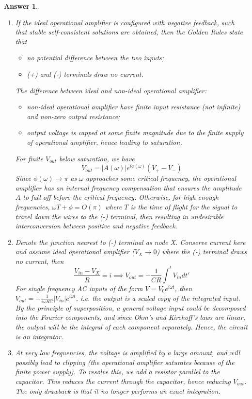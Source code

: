 \documentclass[a4paper]{article}
\newtheorem{ans}{Answer}[subsection]
\theoremstyle{new}
\begin{document}
\begin{ans}\leavevmode
\begin{enumerate}[label=(\roman*)]
\item If the ideal operational amplifier is configured with negative feedback, such that stable self-consistent solutions are obtained, then the Golden Rules state that
\begin{itemize}
    \item no potential difference between the two inputs;
    \item (+) and (-) terminals draw no current.
\end{itemize}
The difference between ideal and non-ideal operational amplifier:
\begin{itemize}
    \item non-ideal operational amplifier have finite input resistance (not infinite) and non-zero output resistance;
    \item output voltage is capped at some finite magnitude due to the finite supply of operational amplifier, hence leading to saturation.
\end{itemize}
For finite $V_{out}$ below saturation, we have
$$V_{out}=|A(\omega)|e^{i\phi(\omega)}(V_+-V_-)$$
Since $\phi(\omega)\rightarrow\pi$ as $\omega$ approaches some critical frequency, the operational amplifier has an internal frequency compensation that ensures the amplitude $A$ to fall off before the critical frequency. Otherwise, for high enough frequencies, $\omega T+\phi=O(\pi)$ where $T$ is the time of flight for the signal to travel down the wires to the (-) terminal, then resulting in undesirable interconversion between positive and negative feedback.
\item Denote the junction nearest to (-) terminal as node X. Conserve current here and assume ideal operational amplifier ($V_X\rightarrow 0$) where the (-) terminal draws no current, then
$$\frac{V_{in}-V_X}{R}=i\implies V_{out}=-\frac{1}{CR}\int^tV_{in}dt'$$
For single frequency AC inputs of the form $V=V_0e^{i\omega t}$, then $V_{out}=-\frac{1}{i\omega RC}|V_{in}|e^{i\omega t}$, i.e. the output is a scaled copy of the integrated input. By the principle of superposition, a general voltage input could be decomposed into the Fourier components, and since Ohm's and Kirchoff's laws are linear, the output will be the integral of each component separately. Hence, the circuit is an integrator.
\item At very low frequencies, the voltage is amplified by a large amount, and will possibly lead to clipping (the operational amplifier saturates because of the finite power supply). To resolve this, we add a resistor parallel to the capacitor. This reduces the current through the capacitor, hence reducing $V_{out}$. The only drawback is that it no longer performs an exact integration.

\end{enumerate}
\end{ans}
\end{document}

